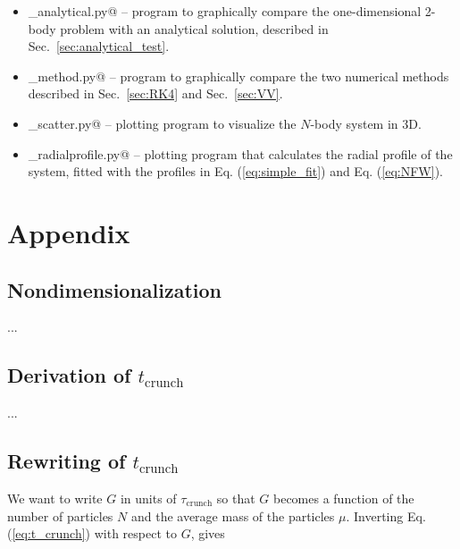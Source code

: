 \documentclass{article}
\begin{document}
\begin{multicols}{2}
\begin{itemize}
	\item \verb@plotting_analytical.py@ -- program to graphically compare the one-dimensional 2-body problem with an analytical solution, described in Sec.~\ref{sec:analytical_test}.
	\item \verb@plot_method.py@ -- program to graphically compare the two numerical methods described in Sec.~\ref{sec:RK4} and Sec.~\ref{sec:VV}.
	\item \verb@plotting_scatter.py@ -- plotting program to visualize the $N$-body system in 3D. 
	\item \verb@plotting_radialprofile.py@ -- plotting program that calculates the radial profile of the system, fitted with the profiles in Eq. (\ref{eq:simple_fit}) and Eq. (\ref{eq:NFW}).
\end{itemize}






\clearpage
\appendix
 
\section{Appendix}

\subsection{Nondimensionalization}\label{sec:nondim_deriv}

...



\subsection{Derivation of $t_{\mathrm{crunch}}$}\label{sec:t_crunch_derive}
 
...
 
\subsection{Rewriting of $t_{\mathrm{crunch}}$}\label{sec:G_derive}

We want to write $G$ in units of $\tau_{\mathrm{crunch}}$ so that $G$ becomes a function of the number of particles $N$ and the average mass of the particles $\mu$. Inverting Eq. (\ref{eq:t_crunch}) with respect to $G$, gives


\end{multicols}
\end{document}
